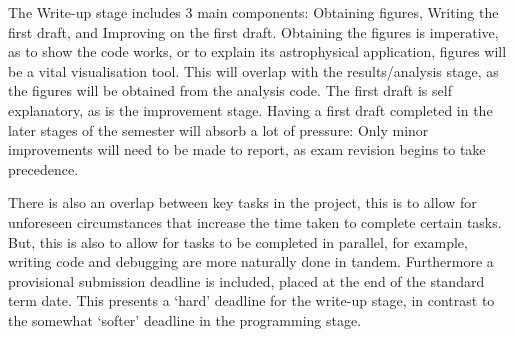 \documentclass[a4paper,10pt]{article}
\begin{document}
The Write-up stage includes 3 main components: Obtaining figures, Writing the first draft, and Improving on the first draft. Obtaining the figures is imperative, as to show the code works, or to explain its astrophysical application, figures will be a vital visualisation tool. This will overlap with the results/analysis stage, as the figures will be obtained from the analysis code. The first draft is self explanatory, as is the improvement stage. Having a first draft completed in the later stages of the semester will absorb a lot of pressure: Only minor improvements will need to be made to report, as exam revision begins to take precedence.


There is also an overlap between key tasks in the project, this is to allow for unforeseen circumstances that increase the time taken to complete certain tasks. But, this is also to allow for tasks to be completed in parallel, for example, writing code and debugging are more naturally done in tandem. Furthermore a provisional submission deadline is included, placed at the end of the standard term date. This presents a `hard' deadline for the write-up stage, in contrast to the somewhat `softer' deadline in the programming stage.
\end{document}
